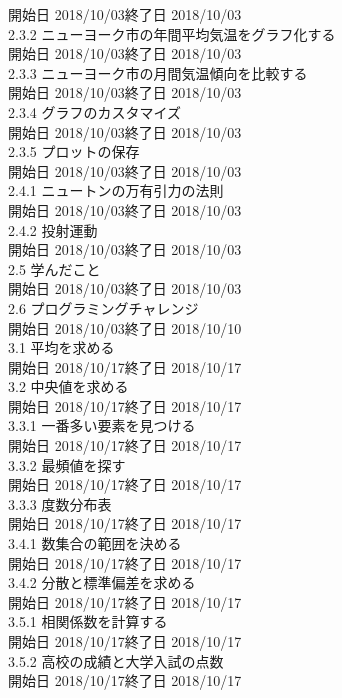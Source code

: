\documentclass[12pt,a4paper]{jsarticle}
\begin{document}
\begin{tabbing}
\>開始日 2018/10/03\>終了日 2018/10/03\\
2.3.2 ニューヨーク市の年間平均気温をグラフ化する\\
\>開始日 2018/10/03\>終了日 2018/10/03\\
2.3.3 ニューヨーク市の月間気温傾向を比較する\\
\>開始日 2018/10/03\>終了日 2018/10/03\\
2.3.4 グラフのカスタマイズ\\
\>開始日 2018/10/03\>終了日 2018/10/03\\
2.3.5 プロットの保存\\
\>開始日 2018/10/03\>終了日 2018/10/03\\
2.4.1 ニュートンの万有引力の法則\\
\>開始日 2018/10/03\>終了日 2018/10/03\\
2.4.2 投射運動\\
\>開始日 2018/10/03\>終了日 2018/10/03\\
2.5 学んだこと\\
\>開始日 2018/10/03\>終了日 2018/10/03\\
2.6 プログラミングチャレンジ\\
\>開始日 2018/10/03\>終了日 2018/10/10\\
3.1 平均を求める\\
\>開始日 2018/10/17\>終了日 2018/10/17\\
3.2 中央値を求める\\
\>開始日 2018/10/17\>終了日 2018/10/17\\
3.3.1 一番多い要素を見つける\\
\>開始日 2018/10/17\>終了日 2018/10/17\\
3.3.2 最頻値を探す\\
\>開始日 2018/10/17\>終了日 2018/10/17\\
3.3.3 度数分布表\\
\>開始日 2018/10/17\>終了日 2018/10/17\\
3.4.1 数集合の範囲を決める\\
\>開始日 2018/10/17\>終了日 2018/10/17\\
3.4.2 分散と標準偏差を求める\\
\>開始日 2018/10/17\>終了日 2018/10/17\\
3.5.1 相関係数を計算する\\
\>開始日 2018/10/17\>終了日 2018/10/17\\
3.5.2 高校の成績と大学入試の点数\\
\>開始日 2018/10/17\>終了日 2018/10/17\\

\end{tabbing}
\end{document}
